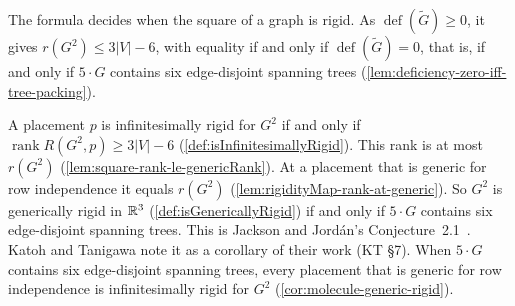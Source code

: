 The formula decides when the square of a graph is rigid. As
$\operatorname{def}(\tilde G) \ge 0$, it gives $r(G^2) \le 3|V| - 6$,
with equality if and only if $\operatorname{def}(\tilde G) = 0$, that is,
if and only if $5 \cdot G$ contains six edge-disjoint spanning trees
(\cref{lem:deficiency-zero-iff-tree-packing}).

A placement $p$ is infinitesimally rigid for $G^2$ if and only if
$\operatorname{rank} R(G^2, p) \ge 3|V| - 6$
(\cref{def:isInfinitesimallyRigid}). This rank is at most $r(G^2)$
(\cref{lem:square-rank-le-genericRank}). At a placement that is generic
for row independence it equals $r(G^2)$
(\cref{lem:rigidityMap-rank-at-generic}). So $G^2$ is generically rigid
in ${\mathbb{R}}^3$ (\cref{def:isGenericallyRigid}) if and only if $5 \cdot G$
contains six edge-disjoint spanning trees. This is Jackson and Jord\'an's
Conjecture~2.1~\cite{jacksonJordan2008}. Katoh and Tanigawa note it as a
corollary of their work (KT \S7). When $5 \cdot G$ contains six
edge-disjoint spanning trees, every placement that is generic for row
independence is infinitesimally rigid for $G^2$
(\cref{cor:molecule-generic-rigid}).
